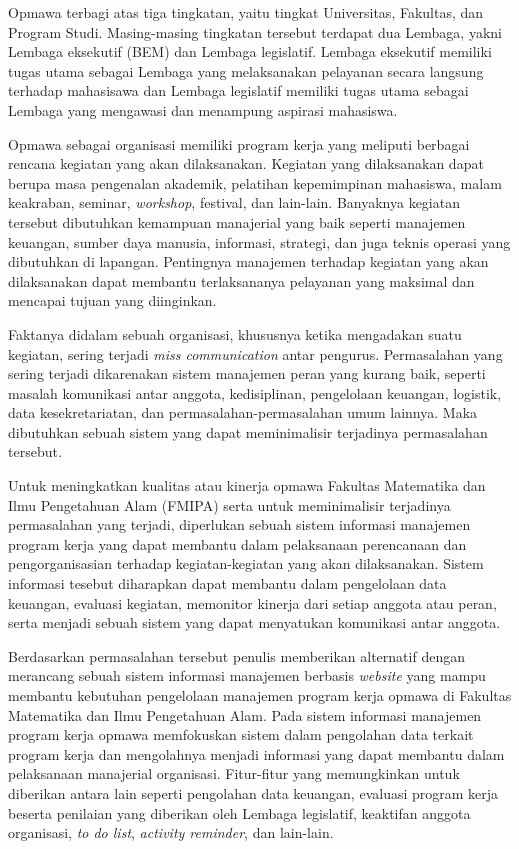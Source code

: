 Opmawa terbagi atas tiga tingkatan, yaitu tingkat Universitas, Fakultas, dan Program Studi. Masing-masing tingkatan tersebut terdapat dua Lembaga, yakni Lembaga eksekutif (BEM) dan Lembaga legislatif. Lembaga eksekutif memiliki tugas utama sebagai Lembaga yang melaksanakan pelayanan secara langsung terhadap mahasisawa dan Lembaga legislatif memiliki tugas utama sebagai Lembaga yang mengawasi dan menampung aspirasi mahasiswa. 

Opmawa sebagai organisasi memiliki program kerja yang meliputi berbagai rencana kegiatan yang akan dilaksanakan. Kegiatan yang dilaksanakan dapat berupa masa pengenalan akademik, pelatihan kepemimpinan mahasiswa, malam keakraban, seminar, \emph{workshop}, festival, dan lain-lain. Banyaknya kegiatan tersebut dibutuhkan kemampuan manajerial yang baik seperti manajemen keuangan, sumber daya manusia, informasi, strategi, dan juga teknis operasi yang dibutuhkan di lapangan. Pentingnya manajemen terhadap kegiatan yang akan dilaksanakan dapat membantu terlaksananya pelayanan yang maksimal dan mencapai tujuan yang diinginkan.

Faktanya didalam sebuah organisasi, khususnya ketika mengadakan suatu kegiatan, sering terjadi \emph{miss communication} antar pengurus. Permasalahan yang sering terjadi dikarenakan sistem manajemen peran yang kurang baik, seperti masalah komunikasi antar anggota, kedisiplinan, pengelolaan keuangan, logistik, data kesekretariatan, dan permasalahan-permasalahan umum lainnya. Maka dibutuhkan sebuah sistem yang dapat meminimalisir terjadinya permasalahan tersebut.

Untuk meningkatkan kualitas atau kinerja opmawa Fakultas Matematika dan Ilmu Pengetahuan Alam (FMIPA) serta untuk meminimalisir terjadinya permasalahan yang terjadi, diperlukan sebuah sistem informasi manajemen program kerja yang dapat membantu dalam pelaksanaan perencanaan dan pengorganisasian terhadap kegiatan-kegiatan yang akan dilaksanakan. Sistem informasi tesebut diharapkan dapat membantu dalam pengelolaan data keuangan, evaluasi kegiatan, memonitor kinerja dari setiap anggota atau peran, serta menjadi sebuah sistem yang dapat menyatukan komunikasi antar anggota. 

Berdasarkan permasalahan tersebut penulis memberikan alternatif dengan merancang sebuah sistem informasi manajemen berbasis \emph{website} yang mampu membantu kebutuhan pengelolaan manajemen program kerja opmawa di Fakultas Matematika dan Ilmu Pengetahuan Alam. Pada sistem informasi manajemen program kerja opmawa memfokuskan sistem dalam pengolahan data terkait program kerja dan mengolahnya menjadi informasi yang dapat membantu dalam pelaksanaan manajerial organisasi. Fitur-fitur yang memungkinkan untuk diberikan antara lain seperti pengolahan data keuangan, evaluasi program kerja beserta penilaian yang diberikan oleh Lembaga legislatif, keaktifan anggota organisasi, \emph{to do list}, \emph{activity reminder}, dan lain-lain.


